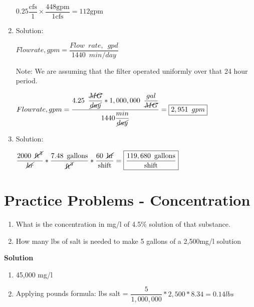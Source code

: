 \begin{enumerate}
\vspace{0.4cm}

$
0.25 \dfrac{\mathrm{cfs}}{1} \times \dfrac{448 \mathrm{gpm}}{1 \mathrm{cfs}}=112 \mathrm{gpm}
$

\vspace{0.4cm}

\item Solution:\\

\vspace{0.2cm}

$Flow rate, gpm=\dfrac{Flow \enspace rate, \enspace gpd}{1440 \enspace min/day}$\\

\vspace{0.2cm}

Note:  We are assuming that the filter operated uniformly over that 24 hour period.\\

\vspace{0.3cm}

$Flow rate, gpm=\dfrac{4.25 \enspace \dfrac{\cancel{MG}}{\cancel{day}} *1,000,000 \enspace \dfrac{gal}{\cancel{MG}}}{1440\dfrac{min}{\cancel{day}}}=\boxed{2,951 \enspace gpm}$


\item Solution:\\

\vspace{0.4cm}

$\dfrac{2000 \enspace \cancel{\mathrm{ft}^3}}{\cancel{hr}}*  \dfrac{7.48 \enspace{\mathrm{gallons}}}{\cancel{\mathrm{ft}^3}}  * \dfrac{60 \enspace \cancel{\mathrm{hr}}}{\mathrm{shift}}   = \boxed{\dfrac{119,680 \enspace \mathrm{gallons}}{\mathrm{shift}}}$

\vspace{0.4cm}
\end{enumerate}


\vspace{1cm}

\section*{Practice Problems - Concentration}
\begin{enumerate}
\item What is the concentration in mg/l of  4.5\% solution of that substance.

\item How many lbs of salt is needed to make 5 gallons of a 2,500mg/l solution

\end{enumerate}
\vspace{0.25cm}
\textbf{Solution}\\
\begin{enumerate}
\item 45,000 mg/l

\item Applying pounds formula:  lbs salt = $\dfrac{5}{1,000,000}*2,500*8.34=\boxed{0.14lbs}$
\end{enumerate}


